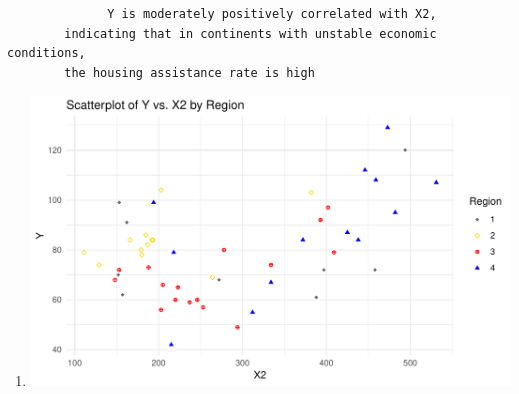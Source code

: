 \documentclass[12pt,letterpaper]{article}
\begin{document}
\begin{itemize}
\begin{table}[!htbp]
	     \begin{verbatim}
	     	  Y is moderately positively correlated with X2,
	  	indicating that in continents with unstable economic conditions,
	  	the housing assistance rate is high
	     \end{verbatim}
       \end{table} 

           \begin{enumerate}
   	        \item[]
	        \includegraphics[width=.85\textwidth]{plot.symbols.colors2_RJ.C.pdf}
           \end{enumerate}
            

\end{itemize}
\end{document}
